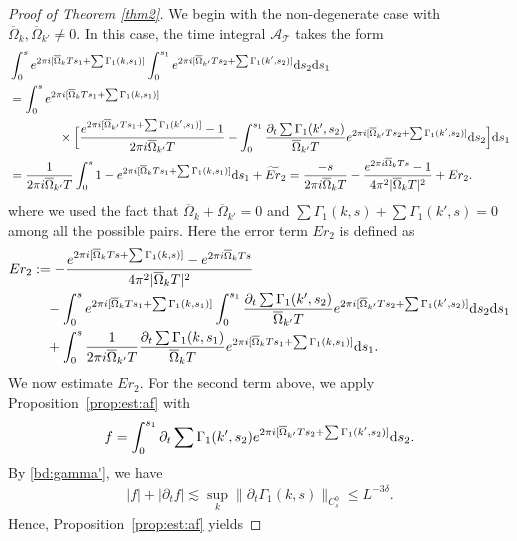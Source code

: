 \documentclass[UTF-8,reqno]{amsart}
\numberwithin{equation}{section}
\theoremstyle{definition}
\def\dif{{\mathord{{\rm d}}}}
\def\leq{\leqslant}
\def\dif{{\mathord{{\rm d}}}}
\def\leq{\leqslant}
\begin{document}
\begin{proof}[Proof of Theorem \ref{thm2}]
We begin with the non-degenerate case with $\overline \Omega_k,\overline \Omega_{k'}\neq 0$. 
In this case, the time integral $\mathcal{A}_{\mathcal{T}}$ takes the form
 \begin{align*}
     &\int_0^se^{2\pi i[\overline \Omega_kTs_1+\sum\Gamma_1(k,s_1)]}\int_0^{s_1}e^{2\pi i[\overline \Omega_{k'}Ts_2+\sum\Gamma_1(k',s_2)]}\dif s_2\dif s_1\\
     &=  \int_0^se^{2\pi i[\overline \Omega_kTs_1+\sum\Gamma_1(k,s_1)]}\notag\\ 
     &\quad\quad\quad\quad\times\Big[\frac{e^{2\pi i[\overline \Omega_{k'}Ts_1+\sum\Gamma_1(k',s_1)]}-1}{2\pi i\overline \Omega_{k'}T}-\int_0^{s_1}\frac{\partial_t\sum\Gamma_1(k',s_2)}{\overline \Omega_{k'}T}e^{2\pi i[\overline \Omega_{k'}Ts_2+\sum\Gamma_1(k',s_2)]}\dif s_2\Big]\dif s_1\\
      &=\frac1{2\pi i\overline \Omega_{k'}T}  \int_0^s1-e^{2\pi i[\overline \Omega_kTs_1+\sum\Gamma_1(k,s_1)]}\dif s_1+\widetilde {Er}_2=\frac{-s}{2\pi i\overline \Omega_{k}T}  -\frac{  e^{2\pi i\overline \Omega_kTs}-1}{4\pi^2|\overline \Omega_{k}T|^2}  +Er_2.
 \end{align*}
where we used the fact that $\overline \Omega_k+\overline \Omega_{k'}=0$ and $\sum\Gamma_1(k,s)+\sum\Gamma_1(k',s)=0$ among all the possible pairs. Here the error term  $Er_2$  is defined as 
 \begin{align*}
     Er_2&:=-\frac{  e^{2\pi i[\overline \Omega_kTs+\sum\Gamma_1(k,s)]}- e^{2\pi i\overline \Omega_kTs}}{4\pi^2|\overline \Omega_{k}T|^2}\\
     &\quad-\int_0^se^{2\pi i[\overline \Omega_kTs_1+\sum\Gamma_1(k,s_1)]} \int_0^{s_1}\frac{\partial_t\sum\Gamma_1(k',s_2)}{\overline \Omega_{k'}T}e^{2\pi i[\overline \Omega_{k'}Ts_2+\sum\Gamma_1(k',s_2)]}\dif s_2 \dif s_1\\
     &\quad+\int_0^s \frac1{2\pi i\overline \Omega_{k'}T}  \frac{\partial_t\sum\Gamma_1(k,s_1)}{\overline \Omega_{k}T}   e^{2\pi i[\overline \Omega_kTs_1+\sum\Gamma_1(k,s_1)]}\dif s_1.
 \end{align*}
We now estimate $Er_2$. For the second term above, we apply Proposition~\ref{prop:est:af} with
  $$f=\int_0^{s_1}\partial_t\sum\Gamma_1(k',s_2)e^{2\pi i[\overline \Omega_{k'}Ts_2+\sum\Gamma_1(k',s_2)]}\dif s_2.$$By \eqref{bd:gamma'}, we have
 \begin{align*}
     |f|+|\partial_tf|\lesssim \sup_k \|\partial_t\Gamma_1(k,s)\|_{C^0_s}\leq L^{-3\delta}.
 \end{align*}
 Hence, Proposition~\ref{prop:est:af} yields

\end{proof}
\end{document}
